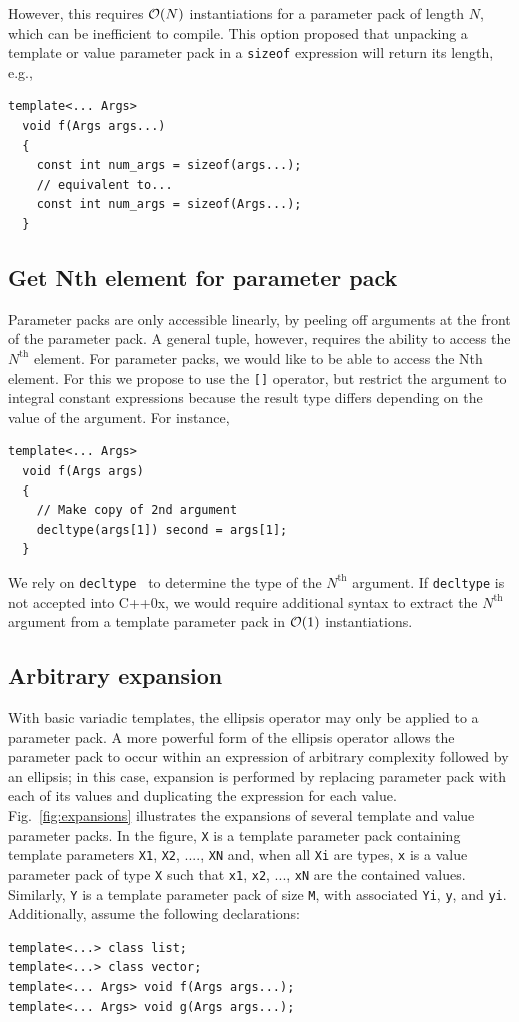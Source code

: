 \documentclass{article}
\begin{document}
However, this requires ${\cal O}(N)$ instantiations for a parameter
pack of length $N$, which can be inefficient to compile. This option
proposed that unpacking a template or value parameter pack in a
\texttt{sizeof} expression will return its length, e.g.,

\begin{verbatim}
template<... Args>
  void f(Args args...)
  {
    const int num_args = sizeof(args...);
    // equivalent to...
    const int num_args = sizeof(Args...);
  }
\end{verbatim}

\subsection{Get Nth element for parameter pack}
Parameter packs are only accessible linearly, by peeling off arguments
at the front of the parameter pack. A general tuple, however, requires
the ability to access the $N^{\text{th}}$ element. For parameter
packs, we would like to be able to access the Nth element. For this we
propose to use the \texttt{[]} operator, but restrict the argument to
integral constant expressions because the result type differs
depending on the value of the argument. For instance,

\begin{verbatim}
template<... Args>
  void f(Args args)
  {
    // Make copy of 2nd argument
    decltype(args[1]) second = args[1];
  }
\end{verbatim}

We rely on \texttt{decltype}~\cite{JarviStroustrup04} to determine the
type of the $N^{\text{th}}$ argument. If \texttt{decltype} is not
accepted into C++0x, we would require additional syntax to extract the
$N^{\text{th}}$ argument from a template parameter pack in ${\cal
  O}(1)$ instantiations.

\subsection{Arbitrary expansion}
With basic variadic templates, the ellipsis operator may only be
applied to a parameter pack. A more powerful form of the ellipsis
operator allows the parameter pack to occur within an expression of
arbitrary complexity followed by an ellipsis; in this case, expansion
is performed by replacing parameter pack with each of its values and
duplicating the expression for each value. Fig.~\ref{fig:expansions}
illustrates the expansions of several template and value parameter
packs. In the figure, \texttt{X} is a template parameter pack
containing template parameters \texttt{X1}, \texttt{X2}, ....,
\texttt{XN} and, when all \texttt{Xi} are types, \texttt{x} is a value
parameter pack of type \texttt{X} such that \texttt{x1}, \texttt{x2},
..., \texttt{xN} are the contained values. Similarly, \texttt{Y} is a
template parameter pack of size \texttt{M}, with associated
\texttt{Yi}, \texttt{y}, and \texttt{yi}. Additionally, assume the
following declarations:
\begin{verbatim}
template<...> class list;
template<...> class vector;
template<... Args> void f(Args args...);
template<... Args> void g(Args args...);
\end{verbatim}
\end{document}

